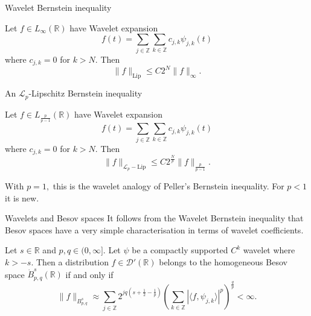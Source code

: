 \documentclass{beamer}
\numberwithin{equation}{section}
\theoremstyle{plain}
\theoremstyle{plain}
\theoremstyle{definition}
\theoremstyle{plain}
\theoremstyle{plain}
\theoremstyle{definition}
\newcommand{\Rl}{\mathbb{R}}
\newcommand{\Itgr}{\mathbb{Z}}
\newcommand{\Dc}{\mathcal{D}}
\newcommand{\Lc}{\mathcal{L}}
\begin{document}
\begin{frame}{Wavelet Bernstein inequality}
    \begin{theorem}
        Let $f\in L_{\infty}(\Rl)$ have Wavelet expansion
        \[
            f(t) = \sum_{j\in \Itgr} \sum_{k\in \Itgr} c_{j,k}\psi_{j,k}(t)
        \]
        where $c_{j,k}=0$ for $k>N.$ Then
        \[
            \|f\|_{\mathrm{Lip}} \leq C2^N \|f\|_{\infty}.
        \]
    \end{theorem}
\end{frame}

\begin{frame}{An $\Lc_p$-Lipschitz Bernstein inequality}
        \begin{theorem}
        Let $f\in L_{\frac{p}{p-1}}(\Rl)$ have Wavelet expansion
        \[
            f(t) = \sum_{j\in \Itgr} \sum_{k\in \Itgr} c_{j,k}\psi_{j,k}(t)
        \]
        where $c_{j,k}=0$ for $k>N.$ Then
        \[
            \|f\|_{\Lc_p-\mathrm{Lip}} \leq C2^{\frac{N}{p}} \|f\|_{\frac{p}{p-1}}.
        \]
    \end{theorem}
    With $p=1,$ this is the wavelet analogy of Peller's Bernstein inequality. For $p<1$ it is new.
\end{frame}

\begin{frame}{Wavelets and Besov spaces}
    It follows from the Wavelet Bernstein inequality that Besov spaces have a very simple characterisation in terms of wavelet coefficients.
    \begin{theorem}[Meyer (1986)]
        Let $s \in \Rl$ and $p,q\in (0,\infty].$ Let $\psi$ be a compactly supported $C^k$ wavelet where $k > -s.$ Then a distribution $f\in \Dc'(\Rl)$
        belongs to the homogeneous Besov space $\dot{B}^{s}_{p,q}(\Rl)$ if and only if
        \begin{equation*}
            \|f\|_{B^s_{p,q}}\approx \sum_{j\in \Itgr} 2^{jq(s+\frac{1}{2}-\frac{1}{p})}\left(\sum_{k\in \Itgr} |\langle f,\psi_{j,k}\rangle|^p\right)^{\frac{q}{p}} < \infty.
        \end{equation*}
    \end{theorem}
\end{frame}


\begin{frame}
\end{frame}
\end{document}
